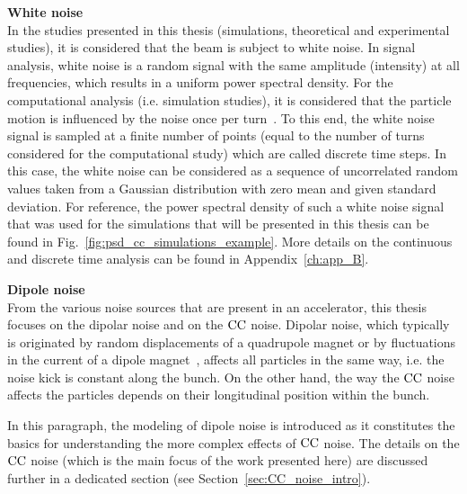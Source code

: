 \textbf{White noise}\\
In the studies presented in this thesis (simulations, theoretical and experimental studies), it is considered that the beam is subject to white noise. In signal analysis, white noise is a random signal with the same amplitude (intensity) at all frequencies, which results in a uniform power spectral density. For the computational analysis (i.e. simulation studies), it is considered that the particle motion is influenced by the noise once per turn~\cite{Lebedev:248620, Lebedev:248622, PhysRevSTAB.18.101001}. To this end, the white noise signal is sampled at a finite number of points (equal to the number of turns considered for the computational study) which are called discrete time steps. In this case, the white noise can be considered as a sequence of uncorrelated random values taken from a Gaussian distribution with zero mean and given standard deviation. For reference, the power spectral density of such a white noise signal that was used for the simulations that will be presented in this thesis can be found in Fig.~\ref{fig:psd_cc_simulations_example}. More details on the continuous and discrete time analysis can be found in Appendix~\ref{ch:app_B}. %



\textbf{Dipole noise}\\
From the various noise sources that are present in an accelerator, this thesis focuses on the dipolar noise and on the ${\mathrm{CC}}$ noise. Dipolar noise, which typically is originated by random displacements of a quadrupole magnet or by fluctuations in the current of a dipole magnet~\cite{Lebedev:248620}, affects all particles in the same way, i.e. the noise kick is constant along the bunch.
On the other hand, the way the ${\mathrm{CC}}$ noise affects the particles depends on their longitudinal position within the bunch. 

In this paragraph, the modeling of dipole noise is introduced as it constitutes the basics for understanding the more complex effects of ${\mathrm{CC}}$ noise. The details on the ${\mathrm{CC}}$ noise (which is the main focus of the work presented here) are discussed further in a dedicated section (see Section~\ref{sec:CC_noise_intro}). 

